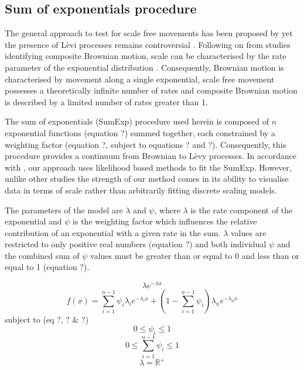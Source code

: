 \documentclass[11pt,usenames,dvipsnames]{article}
\begin{document}
\subsection{Sum of exponentials procedure}

\begin{linenumbers}
\hspace{\parindent}
The general approach to test for scale free movements has been proposed by \cite{Murphy2007} yet the presence of L\`evi processes remains controversial \citep{Pyke2015}. Following on from studies identifying composite Brownian motion, scale can be characterised by the rate parameter of the exponential distribution \citep{Petrovskii2011}. Consequently, Brownian motion is characterised by movement along a single exponential, scale free movement possesses a theoretically infinite number of rates and composite Brownian motion is described by a limited number of rates greater than 1. 

The sum of exponentials (SumExp) procedure used herein is composed of $n$ exponential functions (equation ?) summed together, each constrained by a weighting factor (equation ?, subject to equations ? and ?). Consequently, this procedure provides a continuum from Brownian to L\`evy processes. In accordance with \cite{Murphy2007}, our approach uses likelihood based methods to fit the SumExp. However, unlike other studies \citep{Petrovskii2011, Sakamoto2017, Gautestad2012, Zhao2016} the strength of our method comes in its ability to visualise data in terms of scale rather than arbitrarily fitting discrete scaling models.

The parameters of the model are $\lambda$ and $\psi$, where $\lambda$ is the rate component of the exponential and $\psi$ is the weighting factor which influences the relative contribution of an exponential with a given rate in the sum. $\lambda$ values are restricted to only positive real numbers (equation ?) and both individual $\psi$ and the combined sum of $\psi$ values must be greater than or equal to 0 and less than or equal to 1 (equation ?).
\end{linenumbers}

\begin{equation}
\lambda e^{-\lambda x}
\end{equation}
\begin{equation}
f(x) = \sum_{i=1}^{n-1} \psi_i \lambda_i e^{-\lambda_i x} + \left(1 - \sum_{i=1}^{n-1}\psi_i\right) \lambda_n e^{-\lambda_n x}
\end{equation}
subject to (eq ?, ? \& ?)
\begin{equation}
0\leq \psi_i \leq 1
\end{equation}
\begin{equation}
0\leq \sum_{i=1}^{n-1}\psi_i \leq 1
\end{equation}
\begin{equation}
\lambda = \mathbb{R}^+
\end{equation}
\end{document}
